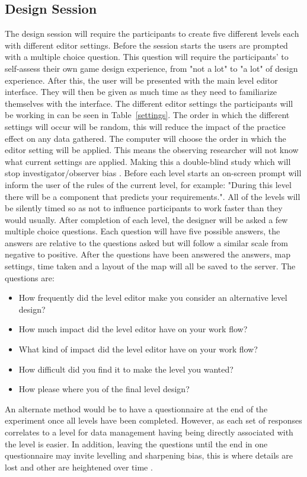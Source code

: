 \documentclass[journal]{IEEEtran}
\begin{document}
\subsection{Design Session}
The design session will require the participants to create five different levels each with different editor settings. Before the session starts the users are prompted with a multiple choice question. This question will require the participants' to self-assess their own game design experience, from "not a lot" to "a lot" of design experience. After this, the user will be presented with the main level editor interface. They will then be given as much time as they need to familiarize themselves with the interface. The different editor settings the participants will be working in can be seen in Table~\ref{settings}. The order in which the different settings will occur will be random, this will reduce the impact of the practice effect on any data gathered. The computer will choose the order in which the editor setting will be applied. This means the observing researcher will not know what current settings are applied.  Making this a double-blind study which will stop investigator/observer bias \cite{phillips1999double}. Before each level starts an on-screen prompt will inform the user of the rules of the current level, for example: "During this level there will be a component that predicts your requirements.". All of the levels will be silently timed so as not to influence participants to work faster than they would usually. After completion of each level, the designer will be asked a few multiple choice questions.  Each question will have five possible answers, the answers are relative to the questions asked but will follow a similar scale from negative to positive. After the questions have been answered the answers, map settings, time taken and a layout of the map will all be saved to the server.
 The questions are:
\begin{itemize}
    \item How frequently did the level editor make you consider an alternative level design?
    
    \item How much impact did the level editor have on your work flow?

    \item What kind of impact did the level editor have on your work flow?

   \item How difficult did you find it to make the level you wanted?

    \item How please where you of the final level design?
\end{itemize}
An alternate method would be to have a questionnaire at the end of the experiment once all levels have been completed. However, as each set of responses correlates to a level for data management having being directly associated with the level is easier. In addition, leaving the questions until the end in one questionnaire may invite levelling and sharpening bias, this is where details are lost and other are heightened over time \cite{koriat2000toward}.
\end{document}
